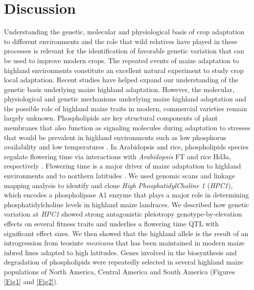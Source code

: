 \documentclass[9pt,twocolumn,twoside,lineno]{biorxiv}
\newcommand{\mex}{\textit{mexicana}\xspace}
\newcommand{\hpc}{\textit{HPC1}\xspace}
\begin{document}
 \section{Discussion}
\label{sec:discussion}
Understanding the genetic, molecular and  physiological basis of crop adaptation to different environments and the role that wild relatives have played in these processes is relevant for the identification of favorable genetic variation that can be used to improve modern crops.
The repeated events of maize adaptation to highland environments constitute an excellent natural experiment to study crop local adaptation. 
Recent studies \cite{Wang2020-mp, Takuno2015-uj, Crow2020-gene} have helped expand our understanding of the genetic basis underlying maize highland adaptation. 
However, the molecular, physiological and genetic mechanisms underlying maize highland adaptation and the possible role of highland maize traits in modern, commercial varieties remain largely unknown.
Phospholipids are key structural components of plant membranes that also function as signaling molecules during adaptation to stresses that would be prevalent in highland environments \cite{Ryu2004-iv, Nakamura2017-vb} such as low phosphorus availability \cite{Veneklaas2012-ls, Cruz-Ramirez2004-ib, Lambers2012-an} and low temperatures \cite{Degenkolbe2012-wf, Welti2002-uk, Marla2017-ph}. 
In Arabidopsis and rice, phospholipids species regulate flowering time via interactions with \textit{Arabidopsis} FT and rice Hd3a, respectively \cite{Nakamura2014-qf, Susila2021-dz, Qu2021-wc}. 
Flowering time is a major driver of maize adaptation to highland environments \cite{Romero_Navarro2017-cn, Gates2019-xu, Mercer2019-vj} and to northern latitudes \cite{Hung2012-ms, Swarts2017-ge}.
We used genomic scans and linkage mapping analysis to identify and clone \textit{High PhosphatidylCholine 1} (\hpc), which encodes a phospholipase A1 enzyme that plays a major role in determining phosphatidylcholine levels in highland maize landraces.
We described how genetic variation at \hpc showed strong antagonistic pleiotropy  genotype-by-elevation effects on several fitness traits and underlies a flowering time QTL with significant effect sizes.
We then showed that the highland allele is the result of an introgression from teosinte \mex that has been maintained in modern maize inbred lines adapted to high latitudes.
Genes involved in the biosynthesis and degradation of phospholipids were repeatedly selected in several highland maize populations of North America, Central America and South America (Figures \cref{Fig1} and \cref{Fig2}). 
\end{document}
